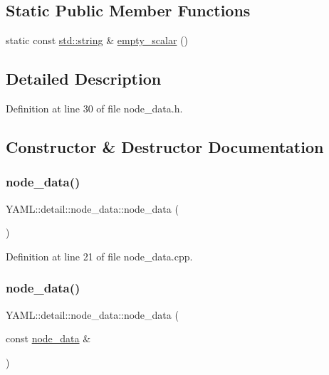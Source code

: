 \subsection*{Static Public Member Functions}
\begin{DoxyCompactItemize}
\item 
static const \mbox{\hyperlink{glad_8h_ac83513893df92266f79a515488701770}{std\+::string}} \& \mbox{\hyperlink{class_y_a_m_l_1_1detail_1_1node__data_a2f80d978fb75e02fdf65353d0685c3af}{empty\+\_\+scalar}} ()
\end{DoxyCompactItemize}


\subsection{Detailed Description}


Definition at line 30 of file node\+\_\+data.\+h.



\subsection{Constructor \& Destructor Documentation}
\mbox{\label{class_y_a_m_l_1_1detail_1_1node__data_aba27100ebb9091c8353ee416666f4c24}} 
\subsubsection{\texorpdfstring{node\_data()}{node\_data()}\hspace{0.1cm}{\footnotesize\ttfamily [1/2]}}
{\footnotesize\ttfamily Y\+A\+M\+L\+::detail\+::node\+\_\+data\+::node\+\_\+data (\begin{DoxyParamCaption}{ }\end{DoxyParamCaption})}



Definition at line 21 of file node\+\_\+data.\+cpp.

\mbox{\label{class_y_a_m_l_1_1detail_1_1node__data_af9ab3a2a658e644c2f0bda170082416a}} 
\subsubsection{\texorpdfstring{node\_data()}{node\_data()}\hspace{0.1cm}{\footnotesize\ttfamily [2/2]}}
{\footnotesize\ttfamily Y\+A\+M\+L\+::detail\+::node\+\_\+data\+::node\+\_\+data (\begin{DoxyParamCaption}\item[{const \mbox{\hyperlink{class_y_a_m_l_1_1detail_1_1node__data}{node\+\_\+data}} \&}]{ }\end{DoxyParamCaption})\hspace{0.3cm}{\ttfamily [delete]}}



